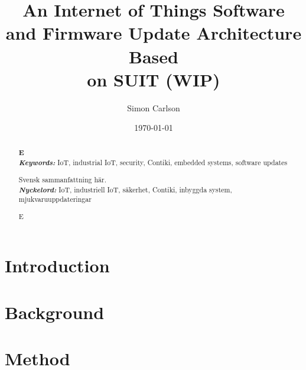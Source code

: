 \documentclass{kththesis}
\title{An Internet of Things Software and Firmware Update Architecture Based\\on SUIT (WIP)}
\author{Simon Carlson}
\date{\today}
\providecommand{\keywords}[1]{\textbf{\textit{Keywords:}} #1}
\providecommand{\nyckelord}[1]{\textbf{\textit{Nyckelord:}} #1}
\begin{document}
\frontmatter

\titlepage

\begin{abstract}
\textbf{E}\\


\noindent\keywords{IoT, industrial IoT, security, Contiki, embedded systems, 
                    software updates}
\end{abstract}

\begin{otherlanguage}{swedish}
    \begin{abstract}
        Svensk sammanfattning här.\\

        \noindent\nyckelord{IoT, industriell IoT, säkerhet, Contiki, inbyggda system,
                            mjukvaruuppdateringar}
    \end{abstract}
\end{otherlanguage}


\renewcommand{\abstractname}{Acknowledgements}
\begin{abstract}
    E
\end{abstract}

\tableofcontents
\listoftables
\listoffigures
\lstlistoflistings
\printglossaries

\mainmatter


\chapter{Introduction}


\chapter{Background}


\chapter{Method}

\end{document}

